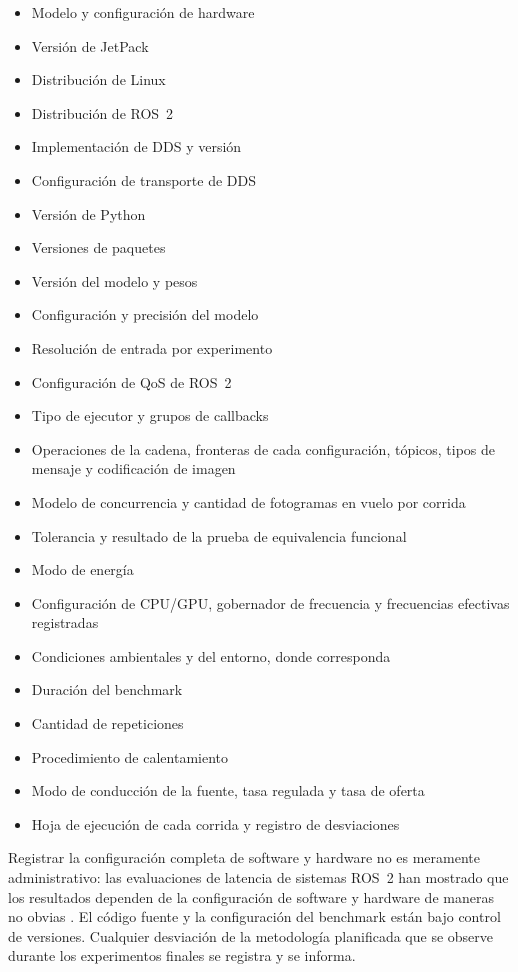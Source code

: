 \begin{itemize}
  \item Modelo y configuración de hardware
  \item Versión de JetPack
  \item Distribución de Linux
  \item Distribución de ROS~2
  \item Implementación de DDS y versión
  \item Configuración de transporte de DDS
  \item Versión de Python
  \item Versiones de paquetes
  \item Versión del modelo y pesos
  \item Configuración y precisión del modelo
  \item Resolución de entrada por experimento
  \item Configuración de QoS de ROS~2
  \item Tipo de ejecutor y grupos de callbacks
  \item Operaciones de la cadena, fronteras de cada configuración, tópicos,
        tipos de mensaje y codificación de imagen
  \item Modelo de concurrencia y cantidad de fotogramas en vuelo por corrida
  \item Tolerancia y resultado de la prueba de equivalencia funcional
  \item Modo de energía
  \item Configuración de CPU/GPU, gobernador de frecuencia y frecuencias
        efectivas registradas
  \item Condiciones ambientales y del entorno, donde corresponda
  \item Duración del benchmark
  \item Cantidad de repeticiones
  \item Procedimiento de calentamiento
  \item Modo de conducción de la fuente, tasa regulada y tasa de oferta
  \item Hoja de ejecución de cada corrida y registro de desviaciones
\end{itemize}

Registrar la configuración completa de software y hardware no es meramente
administrativo: las evaluaciones de latencia de sistemas ROS~2 han mostrado
que los resultados dependen de la configuración de software y hardware de
maneras no obvias \cite{betz2023a, kronauer2021}. El código fuente y la
configuración del benchmark están bajo control de versiones. Cualquier
desviación de la metodología planificada que se observe durante los
experimentos finales se registra y se informa.
